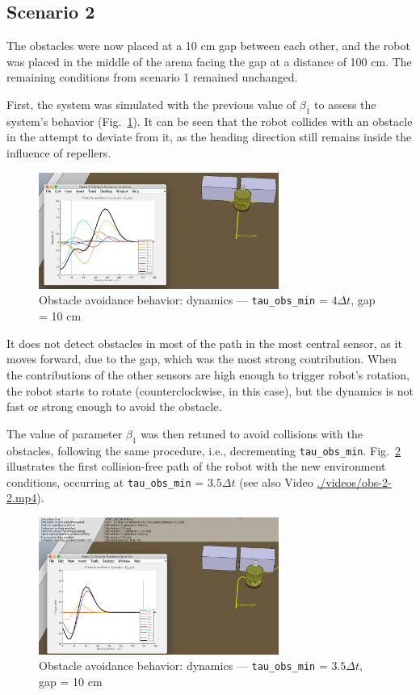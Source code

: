 \subsection{Scenario 2}%
\label{sec:scenario-2-obs}
The obstacles were now placed at a 10 cm gap between each other, 
and the robot was
placed in the middle of the arena facing the gap at a distance of 100 cm. 
The remaining conditions from scenario 1 remained unchanged.

First, the system was simulated with the previous value of $\beta_1$ to assess
the system's behavior (Fig.~\ref{fig:obs-2-2-1}). It can be seen that the robot
collides with an obstacle in the attempt to deviate from it, as the heading
direction still remains inside the influence of repellers. 
%
\begin{figure}[!hbt]
\centering
    \includegraphics[width=0.7\textwidth]{./img/obs-2-2-1.png}
  \caption{Obstacle avoidance behavior: dynamics --- \texttt{tau\_obs\_min} = $4
    \Delta t$, gap = 10 cm}%
\label{fig:obs-2-2-1}
\end{figure}

It does not detect obstacles in most of the path in the most central sensor, as it moves forward, due to the gap, which was
the most strong contribution. When the contributions of the other sensors are
high enough to trigger robot's rotation, the robot starts to rotate
(counterclockwise, in this case), but the dynamics is not fast or strong enough
to avoid the obstacle.

The value of parameter $\beta_1$ was then retuned to avoid collisions with the
obstacles, following the same procedure, i.e., decrementing
\texttt{tau\_obs\_min}. Fig.~\ref{fig:obs-2-2-2} illustrates the first
collision-free path of the robot with the new environment conditions, occurring
at \texttt{tau\_obs\_min} = $3.5 \Delta t$ (see also Video
\href{run:./videos/obs-2-2.mp4}{./videos/obs-2-2.mp4}).
%
\begin{figure}[!hbt]
\centering
    \includegraphics[width=0.7\textwidth]{./img/obs-2-2-2.png}
  \caption{Obstacle avoidance behavior: dynamics --- \texttt{tau\_obs\_min} =
    $3.5 \Delta t$, gap = 10 cm}%
\label{fig:obs-2-2-2}
\end{figure}
%
